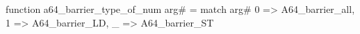 function a64_barrier_type_of_num arg# = match arg# {
  0 => A64_barrier_all,
  1 => A64_barrier_LD,
  _ => A64_barrier_ST
}
